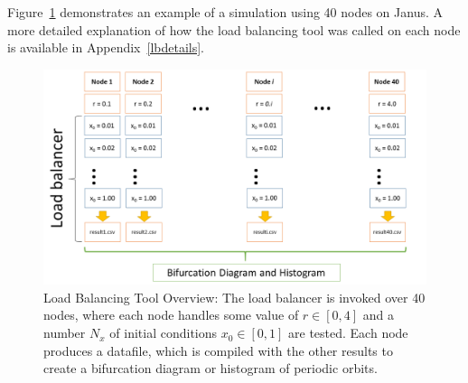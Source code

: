 Figure~\ref{fig:lbtool} demonstrates an example of a simulation
using 40 nodes on Janus. A more detailed explanation of how the load
balancing tool was called on each node is available in
Appendix~\ref{lbdetails}. 
\begin{figure}[H]\linespread{1}   
\caption[Load Balancing Tool Overview]{Load Balancing Tool Overview:
  The load balancer is invoked over 40 nodes, where each node handles
  some value of $r \in [0,4]$ and a number $N_x$ of initial conditions
  $x_0 \in [0,1]$ are tested. Each node produces a datafile, which is
  compiled with the other results to create a bifurcation diagram or
  histogram of periodic orbits.}\label{fig:lbtool}
	\begin{center}
          \includegraphics[scale=0.45]{figs/load_balancer.png}
	\end{center}
\end{figure}


